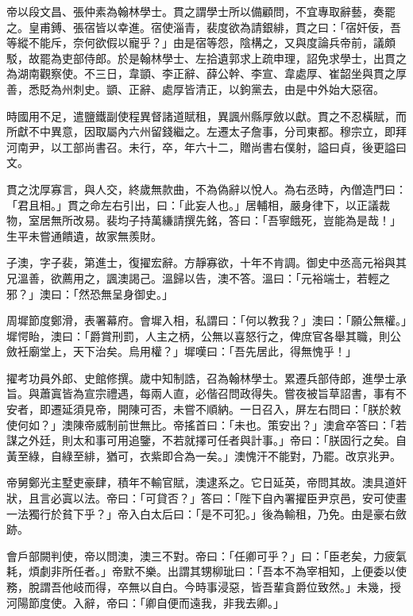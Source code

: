 \begin{pinyinscope}
 帝以段文昌、張仲素為翰林學士。貫之謂學士所以備顧問，不宜專取辭藝，奏罷之。皇甫鎛、張宿皆以幸進。宿使淄青，裴度欲為請銀緋，貫之曰：「宿奸佞，吾等縱不能斥，奈何欲假以寵乎？」由是宿等怨，陰構之，又與度論兵帝前，議頗駁，故罷為吏部侍郎。於是翰林學士、左拾遺郭求上疏申理，詔免求學士，出貫之為湖南觀察使。不三日，韋顗、李正辭、薛公幹、李宣、韋處厚、崔韶坐與貫之厚善，悉貶為州刺史。顗、正辭、處厚皆清正，以鉤黨去，由是中外始大惡宿。



 時國用不足，遣鹽鐵副使程異督諸道賦租，異諷州縣厚斂以獻。貫之不忍橫賦，而所獻不中異意，因取屬內六州留錢繼之。左遷太子詹事，分司東都。穆宗立，即拜河南尹，以工部尚書召。未行，卒，年六十二，贈尚書右僕射，謚曰貞，後更謚曰文。



 貫之沈厚寡言，與人交，終歲無款曲，不為偽辭以悅人。為右丞時，內僧造門曰：「君且相。」貫之命左右引出，曰：「此妄人也。」居輔相，嚴身律下，以正議裁物，室居無所改易。裴均子持萬縑請撰先銘，答曰：「吾寧餓死，豈能為是哉！」生平未嘗通饋遺，故家無羨財。



 子澳，字子裴，第進士，復擢宏辭。方靜寡欲，十年不肯調。御史中丞高元裕與其兄溫善，欲薦用之，諷澳謁己。溫歸以告，澳不答。溫曰：「元裕端士，若輕之邪？」澳曰：「然恐無呈身御史。」



 周墀節度鄭滑，表署幕府。會墀入相，私謂曰：「何以教我？」澳曰：「願公無權。」墀愕眙，澳曰：「爵賞刑罰，人主之柄，公無以喜怒行之，俾庶官各舉其職，則公斂衽廟堂上，天下治矣。烏用權？」墀嘆曰：「吾先居此，得無愧乎！」



 擢考功員外郎、史館修撰。歲中知制誥，召為翰林學士。累遷兵部侍郎，進學士承旨。與蕭寘皆為宣宗禮遇，每兩人直，必偕召問政得失。嘗夜被旨草詔書，事有不安者，即遷延須見帝，開陳可否，未嘗不順納。一日召入，屏左右問曰：「朕於敕使何如？」澳陳帝威制前世無比。帝搖首曰：「未也。策安出？」澳倉卒答曰：「若謀之外廷，則太和事可用追鑒，不若就擇可任者與計事。」帝曰：「朕固行之矣。自黃至綠，自綠至緋，猶可，衣紫即合為一矣。」澳愧汗不能對，乃罷。改京兆尹。



 帝舅鄭光主墅吏豪肆，積年不輸官賦，澳逮系之。它日延英，帝問其故。澳具道奸狀，且言必寘以法。帝曰：「可貸否？」答曰：「陛下自內署擢臣尹京邑，安可使畫一法獨行於貧下乎？」帝入白太后曰：「是不可犯。」後為輸租，乃免。由是豪右斂跡。



 會戶部闕判使，帝以問澳，澳三不對。帝曰：「任卿可乎？」曰：「臣老矣，力疲氣耗，煩劇非所任者。」帝默不樂。出謂其甥柳玼曰：「吾本不為宰相知，上便委以使務，脫謂吾他岐而得，卒無以自白。今時事浸惡，皆吾輩貪爵位致然。」未幾，授河陽節度使。入辭，帝曰：「卿自便而遠我，非我去卿。」




\end{pinyinscope}
